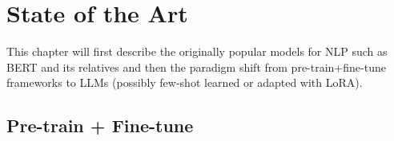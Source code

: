 
\chapter{State of the Art}
This chapter will first describe the originally popular models for NLP such as BERT and its relatives and then the paradigm shift from pre-train+fine-tune frameworks to LLMs (possibly few-shot learned or adapted with LoRA). 

\label{chap:sota}
\section{Pre-train + Fine-tune}
\label{sec:pretrain}
